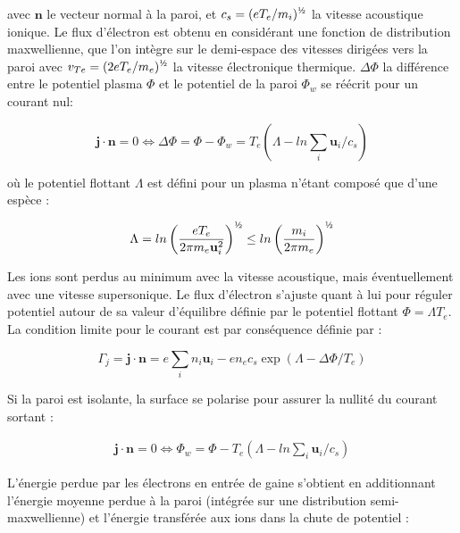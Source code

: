 \begin{refsection}
avec $\mathbf{n}$ le vecteur normal à la paroi,
et $c_s=(eT_e/m_i)^{\text{\textonehalf}}$ la vitesse acoustique ionique. Le flux
d'électron est obtenu en considérant une fonction de distribution maxwellienne, 
que l'on intègre sur le demi-espace des vitesses dirigées vers la paroi avec 
$v_{Te}=(2eT_e/m_e)^{\text{\textonehalf}}$ la vitesse électronique thermique.
$\Delta\Phi$ la différence entre le potentiel plasma $\Phi$ et le potentiel de
la paroi $\Phi_w$ se réécrit pour un courant nul:

\begin{equation}
	\mathbf{j}\cdot\mathbf{n}=0\Leftrightarrow \Delta \Phi=\Phi-\Phi_w =
T_e(\Lambda-ln\sum_i\mathbf u_i/c_s)
\end{equation} 

où le potentiel flottant $\Lambda$ est défini pour un plasma
n'étant composé que d'une espèce :

\begin{equation}
	\Lambda=ln\left(\frac{eT_e}{2\pi
	m_e\mathbf{u}_i^2}\right)^{\text{\textonehalf}} \le 
	ln\left(\frac{m_i}{2\pi m_e}\right)^{\text{\textonehalf}}
\end{equation}

Les ions sont perdus au minimum avec la vitesse acoustique, mais
éventuellement avec une vitesse supersonique. Le flux d'électron s'ajuste
quant à lui pour réguler potentiel autour de sa valeur
d'équilibre définie par le potentiel flottant $\Phi=\Lambda T_e$. La condition
limite pour le courant est par conséquence définie par :

\begin{equation}
\Gamma_j=\mathbf{j}\cdot\mathbf{n}=e\sum_in_i{\mathbf
u}_i-en_ec_s\exp(\Lambda-\Delta \Phi/T_e)
\end{equation}

Si la paroi est isolante, la surface se polarise pour assurer la nullité du
courant sortant :

\begin{equation}\begin{split}
\mathbf j\cdot\mathbf{n}=0\Leftrightarrow
\Phi_w=\Phi-T_e(\Lambda-ln\sum_i\mathbf u_i/c_s)
\end{split}\end{equation}

L'énergie perdue par les électrons en entrée de gaine s'obtient en
additionnant l'énergie moyenne perdue à la paroi (intégrée sur une distribution
semi-maxwellienne) et l'énergie transférée aux ions dans la chute de potentiel :


\end{refsection}
